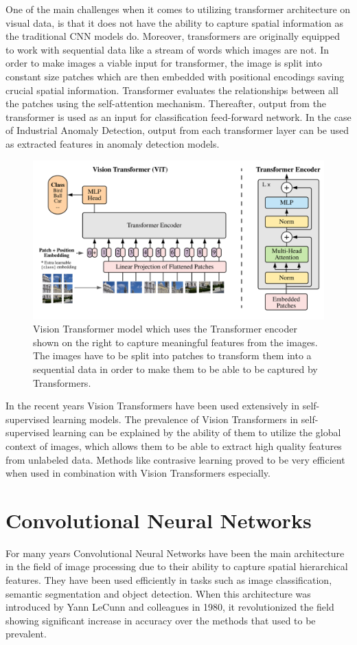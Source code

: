 One of the main challenges when it comes to utilizing transformer architecture on visual data, is that it does not have the ability to capture spatial information as the traditional CNN models do. Moreover, transformers are originally equipped to work with sequential data like a stream of words which images are not. In order to make images a viable input for transformer, the image is split into constant size patches which are then embedded with positional encodings saving crucial spatial information. Transformer evaluates the relationships between all the patches using the self-attention mechanism. Thereafter, output from the transformer is used as an input for classification feed-forward network. In the case of Industrial Anomaly Detection, output from each transformer layer can be used as extracted features in anomaly detection models.

\begin{figure}[h]
	\begin{center}
		\includegraphics[width=0.8\linewidth]{Chapter_2/vit.png}
	\end{center}
	\caption{Vision Transformer model which uses the Transformer encoder shown on the right to capture meaningful features from the images. The images have to be split into patches to transform them into a sequential data in order to make them to be able to be captured by Transformers.}
	\label{fig:vit}
\end{figure}

In the recent years Vision Transformers have been used extensively in self-supervised learning models. The prevalence of Vision Transformers in self-supervised learning can be explained by the ability of them to utilize the global context of images, which allows them to be able to extract high quality features from unlabeled data. Methods like contrasive learning proved to be very efficient when used in combination with Vision Transformers especially.

\section{Convolutional Neural Networks}
\label{cnn}
For many years Convolutional Neural Networks have been the main architecture in the field of image processing due to their ability to capture spatial hierarchical features. They have been used efficiently in tasks such as image classification, semantic segmentation and object detection. When this architecture was introduced by Yann LeCunn and colleagues in 1980, it revolutionized the field showing significant increase in accuracy over the methods that used to be prevalent.

